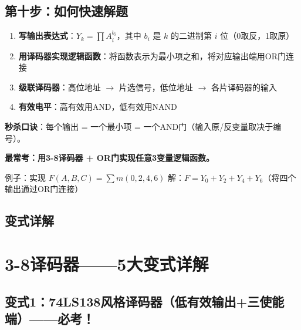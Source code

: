 \section{第十步：如何快速解题}

\begin{examtip}[译码器快速解题法]
\begin{enumerate}
  \item \textbf{写输出表达式}：$Y_k = \prod A_i^{b_i}$，其中 $b_i$ 是 $k$ 的二进制第 $i$ 位（0取反，1取原）
  \item \textbf{用译码器实现逻辑函数}：将函数表示为最小项之和，将对应输出端用OR门连接
  \item \textbf{级联译码器}：高位地址 $\to$ 片选信号，低位地址 $\to$ 各片译码器的输入
  \item \textbf{有效电平}：高有效用AND，低有效用NAND
\end{enumerate}
\end{examtip}

\textbf{秒杀口诀}：每个输出 = 一个最小项 = 一个AND门（输入原/反变量取决于编号）。

\textbf{最常考：用3-8译码器 + OR门实现任意3变量逻辑函数。}

例子：实现 $F(A,B,C) = \sum m(0,2,4,6)$
解：$F = Y_0 + Y_2 + Y_4 + Y_6$（将四个输出通过OR门连接）

\section{变式详解}
\chapter{3-8译码器——5大变式详解}

\section{变式1：74LS138风格译码器（低有效输出+三使能端）——必考！}

